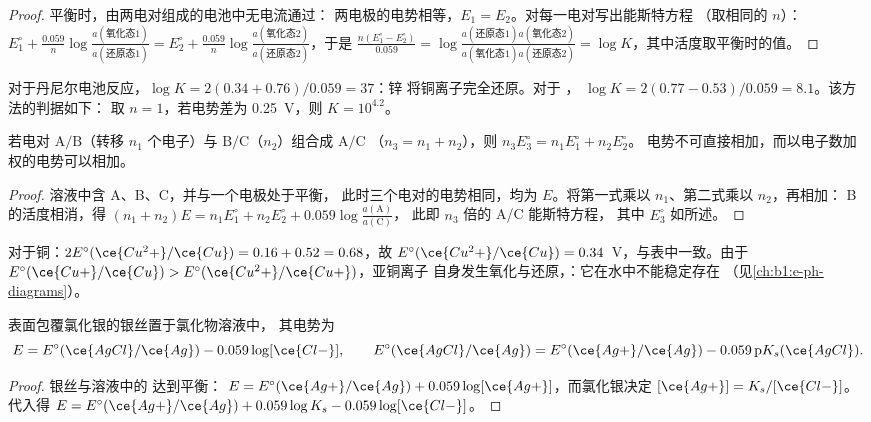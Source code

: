 \begin{proof}
平衡时，由两电对组成的电池中无电流通过：
两电极的电势相等，$E_1 = E_2$。对每一电对写出能斯特方程
（取相同的 $n$）：$E^\circ_1 + \frac{0.059}{n}\log
\frac{a(\text{氧化态1})}{a(\text{还原态1})} = E^\circ_2 + \frac{0.059}{n}\log
\frac{a(\text{氧化态2})}{a(\text{还原态2})}$，于是 $\frac{n(E^\circ_1 -
E^\circ_2)}{0.059} = \log\frac{a(\text{还原态1})a(\text{氧化态2})}{a(\text{氧化态1})
a(\text{还原态2})} = \log K$，其中活度取平衡时的值。
\end{proof}

对于丹尼尔电池反应，$\log K = 2(0.34 + 0.76)/0.059 = 37$：锌
将铜离子完全还原。对于 ，
$\log K = 2(0.77 - 0.53)/0.059 = 8.1$。该方法的判据如下：
取 $n = 1$，若电势差为 \qty{0.25}{V}，则 $K = 10^{4.2}$。

\begin{proposition}[组合电势]\label{prop:b1:nernst:combined-potentials}
若电对 $\mathrm{A}/\mathrm{B}$（转移 $n_1$ 个电子）与
$\mathrm{B}/\mathrm{C}$（$n_2$）组合成 $\mathrm{A}/\mathrm{C}$
（$n_3 = n_1 + n_2$），则 $n_3 E^\circ_3 = n_1 E^\circ_1 + n_2 E^\circ_2$。
电势不可直接相加，而以电子数加权的电势可以相加。
\end{proposition}

\begin{proof}
溶液中含 A、B、C，并与一个电极处于平衡，
此时三个电对的电势相同，均为 $E$。将第一式乘以 $n_1$、第二式乘以 $n_2$，再相加：
B 的活度相消，得 $(n_1 + n_2)E = n_1E^\circ_1 + n_2E^\circ_2 +
0.059\log\frac{a(\mathrm{A})}{a(\mathrm{C})}$，
此即 $n_3$ 倍的 A/C 能斯特方程，
其中 $E^\circ_3$ 如所述。
\end{proof}

对于铜：$2E^\circ(\ce{Cu^2+}/\ce{Cu}) = 0.16 + 0.52 = 0.68$，故
$E^\circ(\ce{Cu^2+}/\ce{Cu}) = 0.34$~V，与表中一致。由于
$E^\circ(\ce{Cu+}/\ce{Cu}) > E^\circ(\ce{Cu^2+}/\ce{Cu+})$，亚铜离子
自身发生氧化与还原，：它在水中不能稳定存在
（见\cref{ch:b1:e-ph-diagrams}）。

\begin{proposition}[第二类电极]\label{prop:b1:nernst:second-kind}
表面包覆氯化银的银丝置于氯化物溶液中，
其电势为
\[
  E = E^\circ(\ce{AgCl}/\ce{Ag}) - 0.059\log[\ce{Cl-}], \qquad
  E^\circ(\ce{AgCl}/\ce{Ag}) = E^\circ(\ce{Ag+}/\ce{Ag}) - 0.059\,\mathrm{p}K_s(\ce{AgCl}) .
\]
\end{proposition}

\begin{proof}
银丝与溶液中的  达到平衡：
$E = E^\circ(\ce{Ag+}/\ce{Ag}) + 0.059\log[\ce{Ag+}]$，而氯化银决定
$[\ce{Ag+}] = K_s/[\ce{Cl-}]$。代入得
$E = E^\circ(\ce{Ag+}/\ce{Ag}) + 0.059\log K_s - 0.059\log[\ce{Cl-}]$。
\end{proof}

